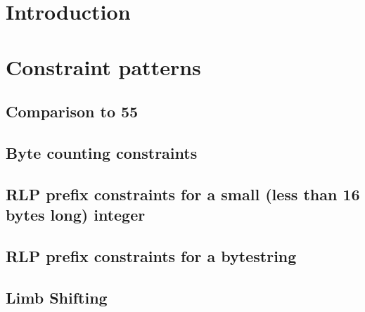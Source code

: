 \section{Introduction}

\section{Constraint patterns}
\subsection{Comparison to 55}                       
\subsection{Byte counting constraints}                         
\subsection{RLP prefix constraints for a small (less than 16 bytes long) integer}              
\subsection{RLP prefix constraints for a bytestring}              
\subsection{Limb Shifting} 

